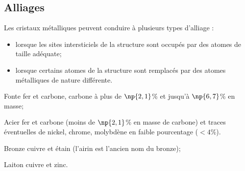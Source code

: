 \subsection*{Alliages}
Les cristaux métalliques peuvent conduire à plusieurs types
d'alliage :
\begin{itemize}
    \item lorsque les sites intersticiels de la structure sont
        occupés par des atomes de taille adéquate;
    \item lorsque certains atomes de la structure sont remplacés
        par des atomes métalliques de nature différente.
\end{itemize}
\begin{ex}
    \begin{compactdesc}
        \item[Fonte] fer et carbone, carbone à plus de $\np{2,1}$\%
            et jusqu'à $\np{6,7}$\% en masse;
        \item[Acier] fer et carbone (moins de $\np{2,1}$\% en masse
            de carbone) et traces éventuelles de nickel, chrome,
            molybdène en faible pourcentage ($<4$\%).
    \end{compactdesc}
\end{ex}
\begin{ex}
    \begin{compactdesc}
        \item[Bronze] cuivre et étain (l'airin est l'ancien nom
            du bronze);
        \item[Laiton] cuivre et zinc.
    \end{compactdesc}
\end{ex}
